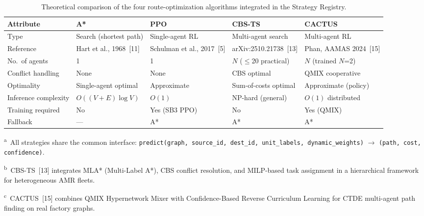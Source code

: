 \begin{table}[htbp]
  \centering
  \caption{Theoretical comparison of the four route-optimization algorithms
           integrated in the Strategy Registry.}
  \label{tab:2}
  \small
  \begin{threeparttable}
    \begin{tabular}{lllll}
      \toprule
      \textbf{Attribute}
        & \textbf{A*}
        & \textbf{PPO}
        & \textbf{CBS-TS}
        & \textbf{CACTUS} \\
      \midrule
      Type
        & Search (shortest path)
        & Single-agent RL
        & Multi-agent search
        & Multi-agent RL \\
      Reference
        & Hart et al., 1968~[11]
        & Schulman et al., 2017~[5]
        & arXiv:2510.21738~[13]
        & Phan, AAMAS 2024~[15] \\
      No.\ of agents
        & 1
        & 1
        & $N$ ($\leq$20 practical)
        & $N$ (trained $N$=2) \\
      Conflict handling
        & None
        & None
        & CBS optimal
        & QMIX cooperative \\
      Optimality
        & Single-agent optimal
        & Approximate
        & Sum-of-costs optimal
        & Approximate (policy) \\
      Inference complexity
        & $O((V{+}E)\log V)$
        & $O(1)$
        & NP-hard (general)
        & $O(1)$ distributed \\
      Training required
        & No
        & Yes (SB3 PPO)
        & No
        & Yes (QMIX) \\
      Fallback
        & ---
        & A*
        & A*
        & A* \\
      \bottomrule
    \end{tabular}
    \begin{tablenotes}
      \footnotesize
      \item \textsuperscript{a}~All strategies share the common interface:
            \texttt{predict(graph, source\_id, dest\_id, unit\_labels, dynamic\_weights)}
            $\rightarrow$ \texttt{(path, cost, confidence)}.
      \item \textsuperscript{b}~CBS-TS~[13] integrates MLA* (Multi-Label A*), CBS conflict
            resolution, and MILP-based task assignment in a hierarchical framework
            for heterogeneous AMR fleets.
      \item \textsuperscript{c}~CACTUS~[15] combines QMIX Hypernetwork Mixer with
            Confidence-Based Reverse Curriculum Learning for CTDE multi-agent path
            finding on real factory graphs.
    \end{tablenotes}
  \end{threeparttable}
\end{table}


